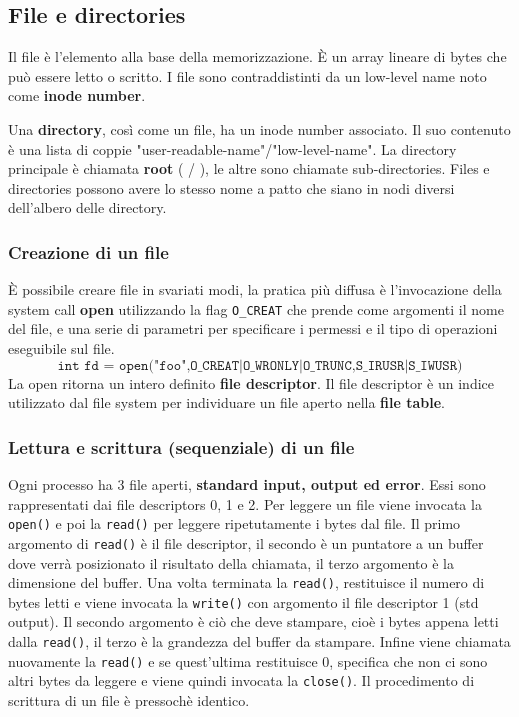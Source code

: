 \documentclass[12pt, letterpaper]{article}
\begin{document}
		\subsection{File e directories}
			Il file è l'elemento alla base della memorizzazione. È un array lineare di bytes che può essere letto o scritto. I file sono contraddistinti da un low-level name noto come \textbf{inode number}.
			
			Una \textbf{directory}, così come un file, ha un inode number associato. Il suo contenuto è una lista di coppie "user-readable-name"/"low-level-name". La directory principale è chiamata \textbf{root} ( / ), le altre sono chiamate sub-directories. Files e directories possono avere lo stesso nome a patto che siano in nodi diversi dell'albero delle directory.
			
			\subsubsection{Creazione di un file}
				È possibile creare file in svariati modi, la pratica più diffusa è l'invocazione della system call \textbf{open} utilizzando la flag \texttt{O\_CREAT} che prende come argomenti il nome del file, e una serie di parametri per specificare i permessi e il tipo di operazioni eseguibile sul file. 
				$$ \texttt{int fd = open("foo",O\_CREAT|O\_WRONLY|O\_TRUNC,S\_IRUSR|S\_IWUSR)} $$
				La open ritorna un intero definito \textbf{file descriptor}. Il file descriptor è un indice utilizzato dal file system per individuare un file aperto nella \textbf{file table}.
				
			\subsubsection{Lettura e scrittura (sequenziale) di un file}
				Ogni processo ha 3 file aperti, \textbf{standard input, output ed error}. Essi sono rappresentati dai file descriptors 0, 1 e 2. Per leggere un file viene invocata la \texttt{open()} e poi la \texttt{read()} per leggere ripetutamente i bytes dal file. Il primo argomento di \texttt{read()} è il file descriptor, il secondo è un puntatore a un buffer dove verrà posizionato il risultato della chiamata, il  terzo argomento è la dimensione del buffer. Una volta terminata la \texttt{read()}, restituisce il numero di bytes letti e viene invocata la \texttt{write()} con argomento il file descriptor 1 (std output). Il secondo argomento è ciò che deve stampare, cioè i bytes appena letti dalla \texttt{read()}, il terzo è la grandezza del buffer da stampare. Infine viene chiamata nuovamente la \texttt{read()} e se quest'ultima restituisce 0, specifica che non ci sono altri bytes da leggere e viene quindi invocata la \texttt{close()}. Il procedimento di scrittura di un file è pressochè identico.
				
\end{document}
